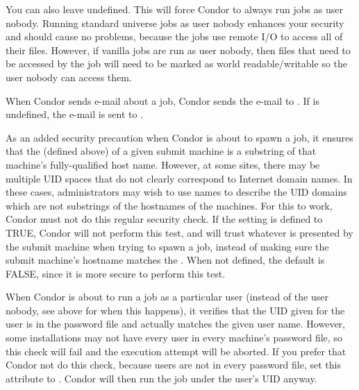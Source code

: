 \begin{description}
  You can also leave  undefined. This will
  force Condor to always run jobs as user nobody.
  Running standard universe jobs as user nobody enhances
  your security and should cause no problems, because the jobs use remote
  I/O to access all of their files.
  However, if vanilla jobs are run as
  user nobody, then files that need to be accessed by the job will need
  to be marked as world readable/writable so the user nobody can access
  them.

  When Condor sends e-mail about a job, Condor sends the e-mail to
  .
  If 
  is undefined, the e-mail is sent to .


\item[\Macro{TRUST\_UID\_DOMAIN}]
  \label{param:TrustUidDomain}
  As an added security precaution when Condor is about to spawn a job,
  it ensures that the  (defined above) of a given
  submit machine is a substring of that machine's fully-qualified
  host name.
  However, at some sites, there may be multiple UID spaces that do
  not clearly correspond to Internet domain names.
  In these cases, administrators may wish to use names to describe the
  UID domains which are not substrings of the hostnames of the
  machines.
  For this to work, Condor must not do this regular security check.
  If the  setting is defined to TRUE,
  Condor will not perform this test, and will trust whatever
   is presented by the submit machine when trying
  to spawn a job, instead of making sure the submit machine's hostname
  matches the .
  When not defined, the default is FALSE,
  since it is more secure to perform this test. 

\item[\Macro{SOFT\_UID\_DOMAIN}] \label{param:SoftUidDomain}
  When Condor is about to run a job as a particular user (instead of the
  user nobody, see  above for when this happens),
  it verifies that the UID given for the user is in the
  password file and actually matches the given user name.
  However, some
  installations may not have every user in every machine's password
  file, so this check will fail and the execution attempt will be
  aborted. If you prefer that Condor not do
  this check, because users are not in every password file, set
  this attribute to . Condor will then run the job under the
  user's UID anyway.



\end{description}
